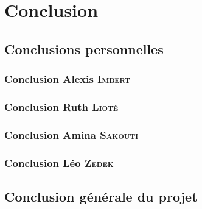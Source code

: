 \section{Conclusion}
	\subsection{Conclusions personnelles}
		\subsubsection{Conclusion Alexis \textsc{Imbert}}
			

		\subsubsection{Conclusion Ruth \textsc{Lioté}}
			

		\subsubsection{Conclusion Amina \textsc{Sakouti}}
			

		\subsubsection{Conclusion Léo \textsc{Zedek}}
			

	\subsection{Conclusion générale du projet}
		
